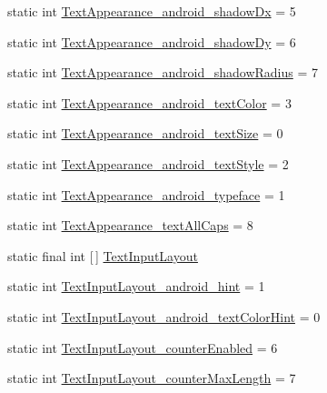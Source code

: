 \begin{DoxyCompactItemize}
static int \hyperlink{classandroid_1_1support_1_1design_1_1R_1_1styleable_a30a8e4e2699c781ee99129168187e77f}{Text\+Appearance\+\_\+android\+\_\+shadow\+Dx} = 5
\item 
static int \hyperlink{classandroid_1_1support_1_1design_1_1R_1_1styleable_aa0966b9f92f1a6c95b273b28b68eb9b4}{Text\+Appearance\+\_\+android\+\_\+shadow\+Dy} = 6
\item 
static int \hyperlink{classandroid_1_1support_1_1design_1_1R_1_1styleable_aadd2af965093afd5bbd56af5349e534d}{Text\+Appearance\+\_\+android\+\_\+shadow\+Radius} = 7
\item 
static int \hyperlink{classandroid_1_1support_1_1design_1_1R_1_1styleable_a94894b984b558f8b9a8b6fab3346043b}{Text\+Appearance\+\_\+android\+\_\+text\+Color} = 3
\item 
static int \hyperlink{classandroid_1_1support_1_1design_1_1R_1_1styleable_a360f5c584c9ab85d870c4a194a6822f1}{Text\+Appearance\+\_\+android\+\_\+text\+Size} = 0
\item 
static int \hyperlink{classandroid_1_1support_1_1design_1_1R_1_1styleable_a0a2a5b4e6900c18a9611ee403142f371}{Text\+Appearance\+\_\+android\+\_\+text\+Style} = 2
\item 
static int \hyperlink{classandroid_1_1support_1_1design_1_1R_1_1styleable_ab0453bf31379b054bdb8f41d7d5ec54b}{Text\+Appearance\+\_\+android\+\_\+typeface} = 1
\item 
static int \hyperlink{classandroid_1_1support_1_1design_1_1R_1_1styleable_ae246508ce6dc881e48a667cda664ad04}{Text\+Appearance\+\_\+text\+All\+Caps} = 8
\item 
static final int \mbox{[}$\,$\mbox{]} \hyperlink{classandroid_1_1support_1_1design_1_1R_1_1styleable_ae01fd2fce65dc8639f3898586b0cedcf}{Text\+Input\+Layout}
\item 
static int \hyperlink{classandroid_1_1support_1_1design_1_1R_1_1styleable_a0b6c36c9dd8175ecc267662c45210acf}{Text\+Input\+Layout\+\_\+android\+\_\+hint} = 1
\item 
static int \hyperlink{classandroid_1_1support_1_1design_1_1R_1_1styleable_a6d956b6c72c2aa19610fc2406c673e22}{Text\+Input\+Layout\+\_\+android\+\_\+text\+Color\+Hint} = 0
\item 
static int \hyperlink{classandroid_1_1support_1_1design_1_1R_1_1styleable_a4c546bc933b45fa150e2148537cf1a2c}{Text\+Input\+Layout\+\_\+counter\+Enabled} = 6
\item 
static int \hyperlink{classandroid_1_1support_1_1design_1_1R_1_1styleable_afce3e6248022ba8506318e081a5e6efb}{Text\+Input\+Layout\+\_\+counter\+Max\+Length} = 7

\end{DoxyCompactItemize}

